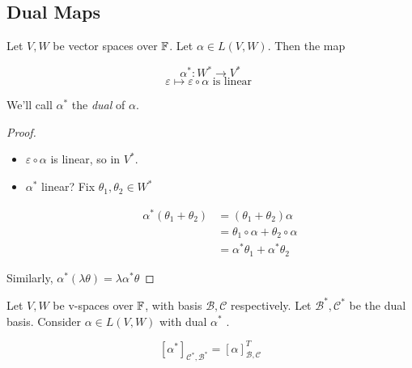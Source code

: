 \documentclass[a4paper]{article}
\begin{document}
\subsection{Dual Maps}

\begin{lemma} 
	Let $ V,W $ be vector spaces over $ \mathbb{F} $. Let $ \alpha \in L(V,W) $. Then the map 
	
	\[ \alpha^{*} : W^{*} \to V^{*} \]
	\[ \varepsilon \mapsto \varepsilon \circ \alpha \text{ is linear } \]
	
	
	We'll call $ \alpha^{*} $ the \emph{dual} of $ \alpha $.
	
	
\end{lemma}


\begin{proof}
	\begin{itemize}
		\item $ \varepsilon \circ \alpha $ is linear, so in $ V^{*} $.
		\item $ \alpha^{*} $ linear? Fix $ \theta_{1},\theta_{2} \in W^{*} $
		
		\begin{align*}
		\alpha^{*}(\theta_{1} + \theta_{2}) & = (\theta_{1} + \theta_{2})\alpha \\
		& = \theta_{1} \circ \alpha + \theta_{2} \circ \alpha \\
		& = \alpha^{*} \theta_{1} + \alpha^{*} \theta_{2}
		\end{align*} 
	\end{itemize}
Similarly, $ \alpha^{*}(\lambda \theta)  = \lambda \alpha^{*} \theta $
\end{proof}


\begin{prop} 
	Let $ V,W $ be v-spaces over $ \mathbb{F} $, with basis $ \mathcal{B},\mathcal{C} $ respectively. Let $ \mathcal{B}^{*},\mathcal{C}^{*} $ be the dual basis. Consider $ \alpha \in L(V,W) $ with dual $ \alpha^{*} $ .
	
	
	\[ [\alpha^{*}]_{\mathcal{C}^{*},\mathcal{B}^{*}} = [\alpha]_{\mathcal{B},\mathcal{C}}^{T} \]
\end{prop}
\end{document}
